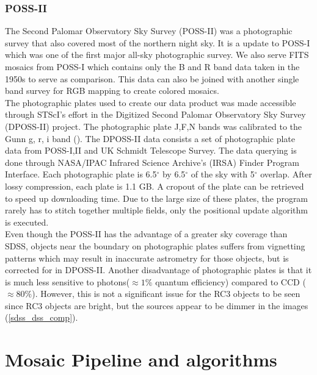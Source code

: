 \documentclass[5p]{elsarticle}
\begin{document}
	\subsubsection{POSS-II}
	The Second Palomar Observatory Sky Survey (POSS-II) was a photographic survey that also covered most of the northern night sky. It is a update to POSS-I which was one of the first major all-sky photographic survey. We also serve FITS mosaics from POSS-I which contains only the B and R band data taken in the 1950s to serve as comparison. This data can also be joined with another single band survey  for RGB mapping to create colored mosaics.
\\
\indent	The photographic plates used to create our data product was made accessible through  STScI's effort in the Digitized Second Palomar Observatory Sky Survey (DPOSS-II) project. The photographic plate J,F,N bands was calibrated to the Gunn g, r, i band (\citet{dposs}). The DPOSS-II data consists a set of  photographic plate data from POSS-I,II and UK Schmidt Telescope Survey. The data querying is done  through NASA/IPAC Infrared Science Archive's  (IRSA) Finder Program Interface. Each photographic plate is 6.5$^{\circ}$ by 6.5$^{\circ}$ of the sky with 5$^{\circ}$ overlap. After lossy compression, each plate is 1.1 GB. A cropout of the plate  can be retrieved  to speed up downloading time. Due to the large size of these plates, the program rarely has to stitch together multiple fields, only the positional update algorithm is executed.
\\
\indent Even though the POSS-II has the advantage of a  greater sky coverage than SDSS, objects near the boundary on photographic plates suffers from vignetting patterns which may result in inaccurate astrometry for those objects, but is corrected for in DPOSS-II.	Another disadvantage of photographic plates is that it is much less sensitive to photons($\approx 1\%$ quantum efficiency) compared to  CCD  ($\approx 80\%$). However, this is not a significant issue for the RC3 objects to be seen since RC3 objects are bright, but the sources appear to be dimmer in the images (\autoref{sdss_dss_comp}). 
\section{Mosaic Pipeline and algorithms}
\end{document}
